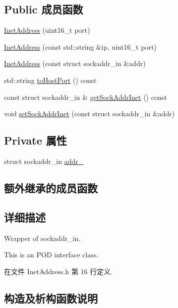 \subsection*{Public 成员函数}
\begin{DoxyCompactItemize}
\item 
\hyperlink{classmuduo_1_1InetAddress_a292e10332bd93f9262a79103d270fc54}{Inet\+Address} (uint16\+\_\+t port)
\item 
\hyperlink{classmuduo_1_1InetAddress_ad4031243c174a53e1d2ff57e97f8226b}{Inet\+Address} (const std\+::string \&ip, uint16\+\_\+t port)
\item 
\hyperlink{classmuduo_1_1InetAddress_a8d41e312d44ecfdf968e66a26fea15ab}{Inet\+Address} (const struct sockaddr\+\_\+in \&addr)
\item 
std\+::string \hyperlink{classmuduo_1_1InetAddress_afe6339cb39e2b7972bccd0f1418a062c}{to\+Host\+Port} () const
\item 
const struct sockaddr\+\_\+in \& \hyperlink{classmuduo_1_1InetAddress_a1878fa474832ba9fa73958124c0404cc}{get\+Sock\+Addr\+Inet} () const
\item 
void \hyperlink{classmuduo_1_1InetAddress_ac40372dd403192210eddb5e699a420c7}{set\+Sock\+Addr\+Inet} (const struct sockaddr\+\_\+in \&addr)
\end{DoxyCompactItemize}
\subsection*{Private 属性}
\begin{DoxyCompactItemize}
\item 
struct sockaddr\+\_\+in \hyperlink{classmuduo_1_1InetAddress_a6d6d32117d52a72865bf26dc7e0bc646}{addr\+\_\+}
\end{DoxyCompactItemize}
\subsection*{额外继承的成员函数}


\subsection{详细描述}
Wrapper of sockaddr\+\_\+in.

This is an P\+OD interface class. 

在文件 Inet\+Address.\+h 第 16 行定义.



\subsection{构造及析构函数说明}
\mbox{\label{classmuduo_1_1InetAddress_a292e10332bd93f9262a79103d270fc54}} 
